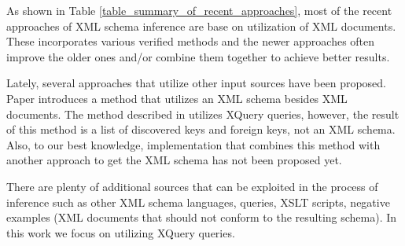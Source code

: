 As shown in Table \ref{table_summary_of_recent_approaches}, most of the recent approaches of XML schema inference are base on utilization of XML documents. These incorporates various verified methods and the newer approaches often improve the older ones and/or combine them together to achieve better results.

Lately, several approaches that utilize other input sources have been proposed. Paper \cite{Mlynkova:2009:IXS:1862681.1862693} introduces a method that utilizes an XML schema besides XML documents. The method described in \cite{Necasky:2009:DXK:1529282.1529414} utilizes XQuery queries, however, the result of this method is a list of discovered keys and foreign keys, not an XML schema. Also, to our best knowledge, implementation that combines this method with another approach to get the XML schema has not been proposed yet. 

There are plenty of additional sources that can be exploited in the process of inference such as other XML schema languages, queries, XSLT scripts, negative examples (XML documents that should not conform to the resulting schema). In this work we focus on utilizing XQuery queries.